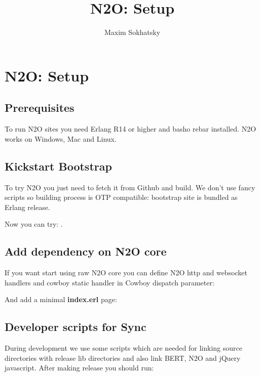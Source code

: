 \documentclass[11pt]{article}
\begin{document}
\title{N2O: Setup}
\author{Maxim Sokhatsky}

\paragraph{}
\section*{N2O: Setup}

\subsection*{Prerequisites}
To run N2O sites you need Erlang R14 or higher and basho rebar installed.
N2O works on Windows, Mac and Linux.

\subsection*{Kickstart Bootstrap}
To try N2O you just need to fetch it from Github and build. We don't use
fancy scripts so building process is OTP compatible: bootstrap site
is bundled as Erlang release.


Now you can try: .


\subsection*{Add dependency on N2O core}
If you want start using raw N2O core you can define N2O http and websocket handlers and cowboy static
handler in Cowboy dispatch parameter:


And add a minimal {\bf index.erl} page:


\subsection*{Developer scripts for Sync}
During development we use some scripts which are needed for linking source
directories with release lib directories and also link BERT, N2O and jQuery javascript.
After making release you should run:
\end{document}
